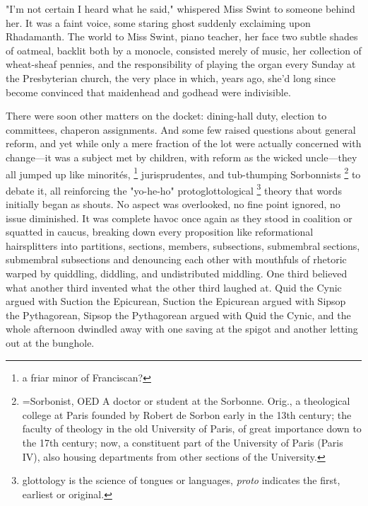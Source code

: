   "I'm not certain I heard what he said," whispered Miss Swint to someone behind
her. It was a faint voice, some staring ghost suddenly exclaiming upon
Rhadamanth. The world to Miss Swint, piano teacher, her face two subtle shades
of oatmeal, backlit both by a monocle, consisted merely of music, her collection
of wheat-sheaf pennies, and the responsibility of playing the organ every Sunday
at the Presbyterian church, the very place in which, years ago, she'd long since
become convinced that maidenhead and godhead were indivisible.

  There were soon other matters on the docket: 
dining-hall duty, election to committees, chaperon 
assignments. And some few raised questions about general
reform, and yet while only a mere fraction of the lot were actually concerned
with change---it was a subject met by children, with reform as the wicked
uncle---they all jumped up like minorités, 
\footnote{\textdbend a friar minor of Franciscan?}
jurisprudentes, and tub-thumping Sorbonnists 
\footnote{=Sorbonist, OED A doctor or student at the Sorbonne. Orig., a
theological college at Paris founded by Robert de Sorbon early in the 13th
century; the faculty of theology in the old University of Paris, of great
importance down to the 17th century; now, a constituent part of the University
of Paris (Paris IV), also housing departments from other sections of the
University.}
to debate it, all reinforcing the "yo-he-ho" protoglottological
\footnote{\textdbend glottology is the science of tongues or languages, 
  \textit{proto} indicates the first, earliest or original.}
theory that words initially began as shouts. No aspect was overlooked, no fine
point ignored, no issue diminished. It was complete havoc once again as they
stood in coalition or squatted 
in caucus, breaking down every proposition like reformational hairsplitters 
into partitions, sections, members, subsections,
submembral sections, submembral subsections and denouncing each other with
mouthfuls of rhetoric warped by quiddling, 
diddling, 
and undistributed middling.
One third believed what another third invented what the other third laughed at.
Quid the Cynic argued with Suction the Epicurean, Suction the Epicurean argued
with Sipsop the Pythagorean, Sipsop the Pythagorean argued with Quid the Cynic,
and the whole afternoon dwindled away with one saving at the spigot and another
letting out at the bunghole.

